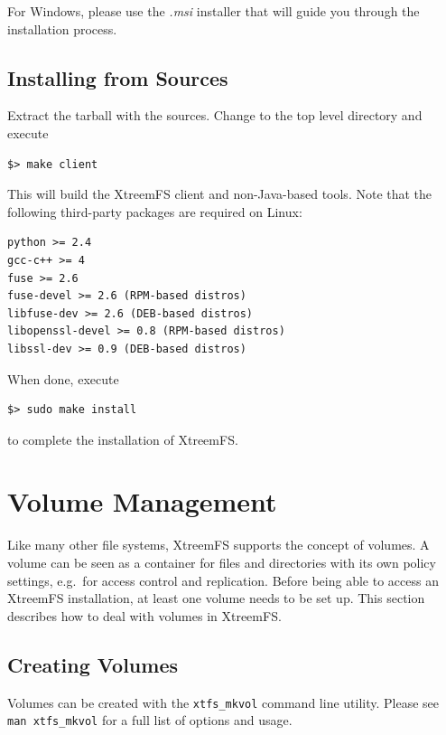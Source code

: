 \documentclass[a4paper,10pt]{book}
\begin{document}
For Windows, please use the \emph{.msi} installer that will guide you through the installation process.

\subsection{Installing from Sources}

Extract the tarball with the sources. Change to the top level directory and execute

\begin{verbatim}
$> make client
\end{verbatim}

This will build the XtreemFS client and non-Java-based tools. Note that the following third-party packages are required on Linux:

\begin{verbatim}
python >= 2.4
gcc-c++ >= 4
fuse >= 2.6
fuse-devel >= 2.6 (RPM-based distros)
libfuse-dev >= 2.6 (DEB-based distros)
libopenssl-devel >= 0.8 (RPM-based distros)
libssl-dev >= 0.9 (DEB-based distros)
\end{verbatim}

When done, execute

\begin{verbatim}
$> sudo make install
\end{verbatim}

to complete the installation of XtreemFS.


\section{Volume Management}

Like many other file systems, XtreemFS supports the concept of volumes. A volume can be seen as a container for files and directories with its own policy settings, e.g.\ for access control and replication. Before being able to access an XtreemFS installation, at least one volume needs to be set up. This section describes how to deal with volumes in XtreemFS.

\subsection{Creating Volumes}
\label{sec:create_volume}

Volumes can be created with the \texttt{xtfs\_mkvol} command line utility. Please see \texttt{man xtfs\_mkvol} for a full list of options and usage.
\end{document}
